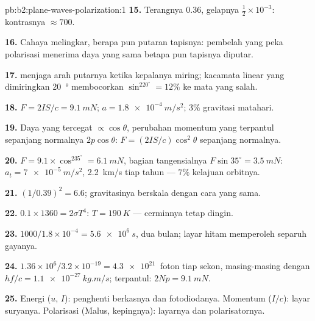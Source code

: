 \begin{solution}{pb:b2:plane-waves-polarization:1}
\textbf{15.} Terangnya $0.36$, gelapnya $\tfrac12 \times 10^{-3}$: kontrasnya $\approx 700$.

\textbf{16.} Cahaya melingkar, berapa pun putaran tapisnya: pembelah
yang peka polarisasi menerima daya yang sama betapa pun
tapisnya diputar.

\textbf{17.}  menjaga arah putarnya ketika kepalanya
miring; kacamata linear yang dimiringkan \qty{20}{\degree} membocorkan $\sin^220^\circ = 12\%$ ke
mata yang salah.

\textbf{18.} $F = 2IS/c = \qty{9.1}{mN}$; $a = \qty{1.8e-4}{m/s^2}$; $3\%$ gravitasi
matahari.

\textbf{19.} Daya yang tercegat $\propto\cos\theta$, perubahan momentum yang terpantul
sepanjang normalnya $2p\cos\theta$: $F = (2IS/c)\cos^2\theta$ sepanjang normalnya.

\textbf{20.} $F = 9.1 \times \cos^235^\circ = \qty{6.1}{mN}$, bagian tangensialnya $F\sin35^\circ
= \qty{3.5}{mN}$: $a_t = \qty{7e-5}{m/s^2}$, \qty{2.2}{km/s} tiap tahun --- $7\%$
kelajuan orbitnya.

\textbf{21.} $(1/0.39)^2 = 6.6$; gravitasinya berskala dengan cara yang sama.

\textbf{22.} $0.1 \times 1360 = 2\sigma T^4$: $T = \qty{190}{K}$ --- cerminnya tetap
dingin.

\textbf{23.} $1000/1.8 \times 10^{-4} = \qty{5.6e6}{s}$, dua bulan; layar hitam
memperoleh separuh gayanya.

\textbf{24.} $1.36 \times 10^6/3.2 \times 10^{-19} = \qty{4.3e21}{}$ foton tiap sekon,
masing-masing dengan $hf/c = \qty{1.1e-27}{kg.m/s}$; terpantul: $2Np = \qty{9.1}{mN}$.

\textbf{25.} Energi ($u$, $I$): penghenti berkasnya dan fotodiodanya.
Momentum ($I/c$): layar suryanya. Polarisasi (Malus, kepingnya): layarnya
dan polarisatornya.
\end{solution}
